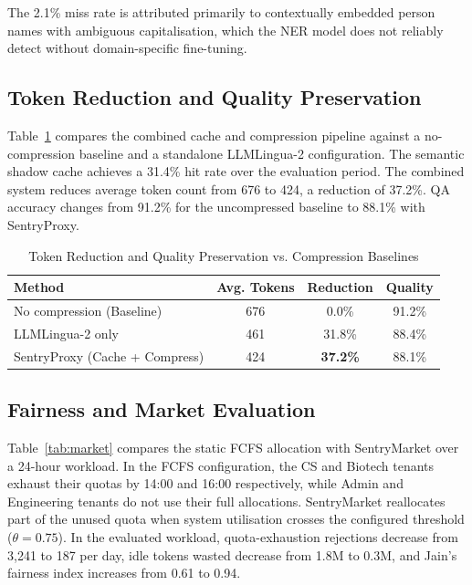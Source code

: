 \documentclass[conference]{IEEEtran}
\begin{document}
The 2.1\% miss rate is attributed primarily to contextually embedded person names with ambiguous capitalisation, which the NER model does not reliably detect without domain-specific fine-tuning.

\subsection{Token Reduction and Quality Preservation}
Table~\ref{tab:tokens} compares the combined cache and compression pipeline against a no-compression baseline and a standalone LLMLingua-2 configuration. The semantic shadow cache achieves a 31.4\% hit rate over the evaluation period. The combined system reduces average token count from 676 to 424, a reduction of 37.2\%. QA accuracy changes from 91.2\% for the uncompressed baseline to 88.1\% with SentryProxy.

\begin{table}[htbp]
\caption{Token Reduction and Quality Preservation vs. Compression Baselines}
\begin{center}
\begin{tabular}{|l|c|c|c|}
\hline
\textbf{Method} & \textbf{Avg. Tokens} & \textbf{Reduction} & \textbf{Quality} \\
\hline
No compression (Baseline)            & 676 & 0.0\%  & 91.2\% \\
LLMLingua-2 only \cite{b_llmlingua} & 461 & 31.8\% & 88.4\% \\
SentryProxy (Cache + Compress)       & 424 & \textbf{37.2\%} & 88.1\% \\
\hline
\end{tabular}
\label{tab:tokens}
\end{center}
\end{table}

\subsection{Fairness and Market Evaluation}
Table~\ref{tab:market} compares the static FCFS allocation with SentryMarket over a 24-hour workload. In the FCFS configuration, the CS and Biotech tenants exhaust their quotas by 14:00 and 16:00 respectively, while Admin and Engineering tenants do not use their full allocations. SentryMarket reallocates part of the unused quota when system utilisation crosses the configured threshold ($\theta = 0.75$). In the evaluated workload, quota-exhaustion rejections decrease from 3,241 to 187 per day, idle tokens wasted decrease from 1.8M to 0.3M, and Jain's fairness index increases from 0.61 to 0.94.
\end{document}
